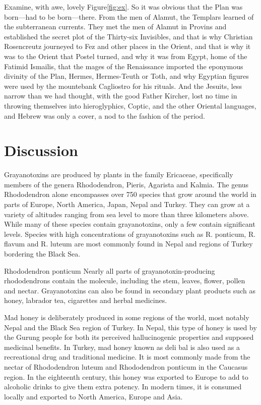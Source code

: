 \documentclass[11pt]{article}
\begin{document}
Examine, with awe, lovely Figure\xspace\ref{fig:ex}.
So it was obvious that the Plan was born---had to be born---there. From
the men of Alamut, the Templars learned of the subterranean currents.
They met the men of Alamut in Provins and established the secret
plot of the Thirty-six Invisibles, and that is why Christian
Rosencreutz journeyed to Fez and other places in the Orient, and
that is why it was to the Orient that Postel turned, and why it was
from Egypt, home of the Fatimid Ismailis, that the mages of the
Renaissance imported the eponymous divinity of the Plan, Hermes,
Hermes-Teuth or Toth, and why Egyptian figures were used by the
mountebank Cagliostro for his rituals. And the Jesuits, less narrow
than we had thought, with the good Father Kircher, lost no time in
throwing themselves into hieroglyphics, Coptic, and the other
Oriental languages, and Hebrew was only a cover, a nod to the fashion
of the period.

\section{Discussion}\label{ss:discuss}
Grayanotoxins are produced by plants in the family Ericaceae,
specifically members of the genera Rhododendron, Pieris, Agarista
and Kalmia. The genus Rhododendron alone encompasses over 750
species that grow around the world in parts of Europe, North America,
Japan, Nepal and Turkey. They can grow at a variety of altitudes
ranging from sea level to more than three kilometers above. While
many of these species contain grayanotoxins, only a few contain
significant levels. Species with high concentrations of grayanotoxins
such as R. ponticum, R. flavum and R. luteum are most commonly found
in Nepal and regions of Turkey bordering the Black Sea.

Rhododendron ponticum Nearly all parts of grayanotoxin-producing
rhododendrons contain the molecule, including the stem, leaves,
flower, pollen and nectar. Grayanotoxins can also be found in
secondary plant products such as honey, labrador tea, cigarettes
and herbal medicines.

Mad honey is deliberately produced in some regions of the world,
most notably Nepal and the Black Sea region of Turkey. In Nepal,
this type of honey is used by the Gurung people for both its perceived
hallucinogenic properties and supposed medicinal benefits. In
Turkey, mad honey known as deli bal is also used as a recreational
drug and traditional medicine. It is most commonly made from the
nectar of Rhododendron luteum and Rhododendron ponticum in the
Caucasus region. In the eighteenth century, this honey was
exported to Europe to add to alcoholic drinks to give them extra
potency. In modern times, it is consumed locally and exported to
North America, Europe and Asia.
\end{document}
